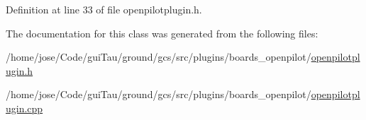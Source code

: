 Definition at line 33 of file openpilotplugin.\-h.



The documentation for this class was generated from the following files\-:\begin{DoxyCompactItemize}
\item 
/home/jose/\-Code/gui\-Tau/ground/gcs/src/plugins/boards\-\_\-openpilot/\hyperlink{openpilotplugin_8h}{openpilotplugin.\-h}\item 
/home/jose/\-Code/gui\-Tau/ground/gcs/src/plugins/boards\-\_\-openpilot/\hyperlink{openpilotplugin_8cpp}{openpilotplugin.\-cpp}\end{DoxyCompactItemize}
